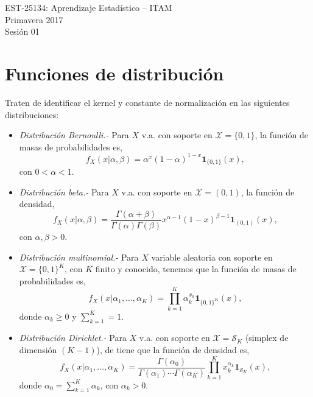 \documentclass[11pt]{article}
\begin{document}
\begin{center}
{\sc EST-25134: Aprendizaje Estad\'istico} -- ITAM\\
\vspace{0.1cm}
Primavera 2017\\
\vspace{0.1cm}
Sesi\'on 01
\end{center}


\def\dsp{\def\baselinestretch{0.7}\large\normalsize}\dsp

%
%
\section{Funciones de distribuci\'on}
\noindent
Traten de identificar el kernel y constante de normalizaci\'on en las siguientes distribuciones:
\begin{itemize}
	\item {\it Distribuci\'on Bernoulli.-} Para $X$ v.a. con soporte en $\mathcal{X}=\{0,1\}$, la funci\'on de masas de probabilidades es,
	\begin{equation}
	f_X(x|\alpha,\beta)=\alpha^{x}(1-\alpha)^{1-x}\boldsymbol{1}_{\{0,1\}}(x),
	\end{equation}
	con $0<\alpha<1$.
	\item {\it Distribuci\'on beta.-} Para $X$ v.a. con soporte en $\mathcal{X}=(0,1)$, la funci\'on de densidad,
		\begin{equation}
		 f_X(x|\alpha,\beta)=\frac{\Gamma(\alpha+\beta)}{\Gamma(\alpha)\Gamma(\beta)}
		 x^{\alpha-1}(1-x)^{\beta-1}\boldsymbol{1}_{(0,1)}(x),
		\end{equation}
	con $\alpha,\beta > 0$.
	\item {\it Distribuci\'on multinomial.-} Para $X$ variable aleatoria con soporte en $\mathcal{X}=\{0,1\}^K$, con $K$ finito y conocido, tenemos que la funci\'on de masas de probabilidades es,
		\begin{equation}
		f_X(x|\alpha_1,\ldots,\alpha_K)=\prod_{k=1}^{K}\alpha_k^{x_k}\boldsymbol{1}_{\{0,1\}^K}(x),
		\end{equation}
		donde $\alpha_k \geq 0$ y $\sum_{k=1}^{K}=1$.
	\item {\it Distribuci\'on Dirichlet.-} Para $X$ v.a. con soporte en $\mathcal{X}=\mathcal{S}_K$ (simplex de dimensi\'on $(K-1)$), de tiene que la funci\'on de densidad es,
		\begin{equation}
		f_X(x|\alpha_1,\ldots,\alpha_K)=\frac{\Gamma(\alpha_0)}{\Gamma(\alpha_1)\cdots \Gamma(\alpha_K)}
		\prod_{k=1}^{K}x_k^{\alpha_k}\boldsymbol{1}_{\mathcal{S}_K}(x),
		\end{equation}
		donde $\alpha_0=\sum_{k=1}^{K}\alpha_k$, con $\alpha_k > 0$.
\end{itemize}
\end{document}
